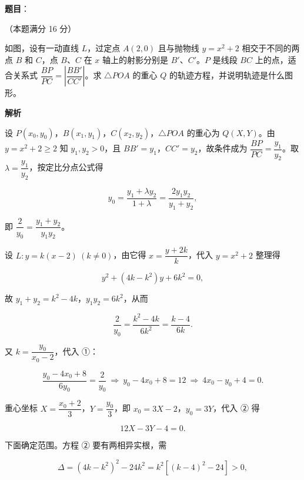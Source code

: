\begin{answer}

\textbf{题目}：

（本题满分 16 分）

如图，设有一动直线 $L$，过定点 $A(2,0)$ 且与抛物线 $y=x^{2}+2$ 相交于不同的两点 $B$ 和 $C$，点 $B$、$C$ 在 $x$ 轴上的射影分别是 $B'$、$C'$。$P$ 是线段 $BC$ 上的点，适合关系式 $\dfrac{BP}{PC}=\left|\dfrac{BB'}{CC'}\right|$。求 $\triangle POA$ 的重心 $Q$ 的轨迹方程，并说明轨迹是什么图形。
\nopagebreak[4]
\begin{center}\end{center}
\nopagebreak[4]
\textbf{解析}

设 $P(x_{0},y_{0})$，$B(x_{1},y_{1})$，$C(x_{2},y_{2})$，$\triangle POA$ 的重心为 $Q(X,Y)$。由 $y=x^{2}+2\ge 2$ 知 $y_{1},y_{2}>0$，且 $BB'=y_{1}$，$CC'=y_{2}$，故条件成为 $\dfrac{BP}{PC}=\dfrac{y_{1}}{y_{2}}$。取 $\lambda=\dfrac{y_{1}}{y_{2}}$，按定比分点公式得

\nopagebreak[4]
\[
y_{0}=\frac{y_{1}+\lambda y_{2}}{1+\lambda}=\frac{2y_{1}y_{2}}{y_{1}+y_{2}},
\]

即 $\dfrac{2}{y_{0}}=\dfrac{y_{1}+y_{2}}{y_{1}y_{2}}$。

设 $L:y=k(x-2)\ (k\ne 0)$，由它得 $x=\dfrac{y+2k}{k}$，代入 $y=x^{2}+2$ 整理得

\nopagebreak[4]
\[
y^{2}+(4k-k^{2})y+6k^{2}=0,
\]

故 $y_{1}+y_{2}=k^{2}-4k$，$y_{1}y_{2}=6k^{2}$，从而

\nopagebreak[4]
\[
\frac{2}{y_{0}}=\frac{k^{2}-4k}{6k^{2}}=\frac{k-4}{6k}. \tag{①}
\]

又 $k=\dfrac{y_{0}}{x_{0}-2}$，代入 ①：

\nopagebreak[4]
\[
\frac{y_{0}-4x_{0}+8}{6y_{0}}=\frac{2}{y_{0}}\ \Longrightarrow\ y_{0}-4x_{0}+8=12
\ \Longrightarrow\ 4x_{0}-y_{0}+4=0. \tag{②}
\]

重心坐标 $X=\dfrac{x_{0}+2}{3}$，$Y=\dfrac{y_{0}}{3}$，即 $x_{0}=3X-2$，$y_{0}=3Y$，代入 ② 得

\nopagebreak[4]
\[
12X-3Y-4=0. \tag{③}
\]

下面确定范围。方程 ② 要有两相异实根，需

\nopagebreak[4]
\[
\Delta=(4k-k^{2})^{2}-24k^{2}=k^{2}\left[(k-4)^{2}-24\right]>0,
\]


\end{answer}

